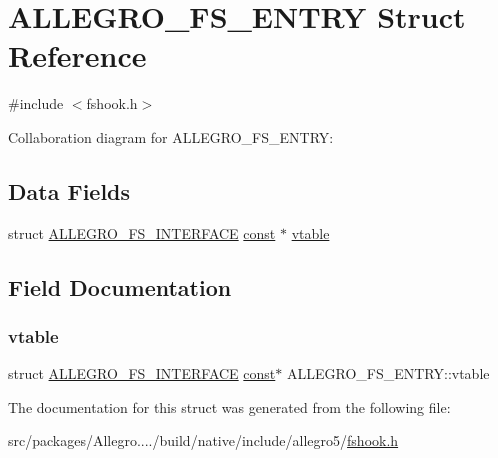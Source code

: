 \hypertarget{struct_a_l_l_e_g_r_o___f_s___e_n_t_r_y}{}\section{A\+L\+L\+E\+G\+R\+O\+\_\+\+F\+S\+\_\+\+E\+N\+T\+RY Struct Reference}
\label{struct_a_l_l_e_g_r_o___f_s___e_n_t_r_y}


{\ttfamily \#include $<$fshook.\+h$>$}



Collaboration diagram for A\+L\+L\+E\+G\+R\+O\+\_\+\+F\+S\+\_\+\+E\+N\+T\+RY\+:
\subsection*{Data Fields}
\begin{DoxyCompactItemize}
\item 
struct \hyperlink{struct_a_l_l_e_g_r_o___f_s___i_n_t_e_r_f_a_c_e}{A\+L\+L\+E\+G\+R\+O\+\_\+\+F\+S\+\_\+\+I\+N\+T\+E\+R\+F\+A\+CE} \hyperlink{zconf_8h_a2c212835823e3c54a8ab6d95c652660e}{const}  $\ast$ \hyperlink{struct_a_l_l_e_g_r_o___f_s___e_n_t_r_y_adfad3aa4957c668fdc9ef993326f213e}{vtable}
\end{DoxyCompactItemize}


\subsection{Field Documentation}
\mbox{\label{struct_a_l_l_e_g_r_o___f_s___e_n_t_r_y_adfad3aa4957c668fdc9ef993326f213e}} 
\subsubsection{\texorpdfstring{vtable}{vtable}}
{\footnotesize\ttfamily struct \hyperlink{struct_a_l_l_e_g_r_o___f_s___i_n_t_e_r_f_a_c_e}{A\+L\+L\+E\+G\+R\+O\+\_\+\+F\+S\+\_\+\+I\+N\+T\+E\+R\+F\+A\+CE} \hyperlink{zconf_8h_a2c212835823e3c54a8ab6d95c652660e}{const}$\ast$ A\+L\+L\+E\+G\+R\+O\+\_\+\+F\+S\+\_\+\+E\+N\+T\+R\+Y\+::vtable}



The documentation for this struct was generated from the following file\+:\begin{DoxyCompactItemize}
\item 
src/packages/\+Allegro..../build/native/include/allegro5/\hyperlink{fshook_8h}{fshook.\+h}\end{DoxyCompactItemize}

